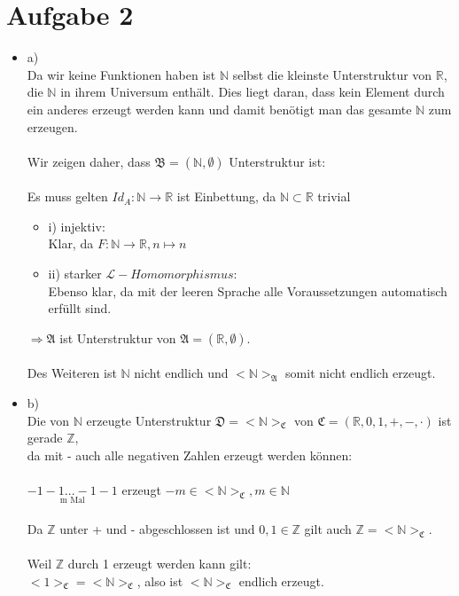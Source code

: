 \documentclass[a4paper]{scrartcl}
\begin{document}
\section*{Aufgabe 2}%
\label{sec:aufgabe_2}
\begin{itemize}
    \item a)\\
        Da wir keine Funktionen haben ist $\mathds{N}$ selbst die kleinste Unterstruktur von $\mathds{R}$, die $\mathds{N}$ in ihrem Universum enthält.
        Dies liegt daran, dass kein Element durch ein anderes erzeugt werden kann und damit benötigt man das gesamte $\mathds{N}$ zum erzeugen.\\
        \\Wir zeigen daher, dass $\mathfrak{B} = (\mathds{N}, \emptyset)$ Unterstruktur ist:\\
        \\Es muss gelten $Id_A: \mathds{N} \rightarrow \mathds{R}$ ist Einbettung, da $\mathds{N} \subset \mathds{R}$ trivial
        \begin{itemize}
            \item i) injektiv:\\
                Klar, da $F: \mathds{N} \rightarrow \mathds{R}, n \mapsto n$
            \item ii) starker $\mathscr{L}-Homomorphismus$:\\
                Ebenso klar, da mit der leeren Sprache alle Voraussetzungen automatisch erfüllt sind.
        \end{itemize}
        $\Rightarrow \mathfrak{A}$ ist Unterstruktur von $\mathfrak{A} = (\mathds{R}, \emptyset)$.\\

        \\Des Weiteren ist $\mathds{N}$ nicht endlich und $<\mathds{N}>_\mathfrak{A}$ somit nicht endlich erzeugt.\\

    \item b)\\
        Die von $\mathds{N}$ erzeugte Unterstruktur $\mathfrak{D} = <\mathds{N}>_\mathfrak{C}$ von $\mathfrak{C} = (\mathds{R},0,1,+,-,\cdot)$ ist gerade $\mathds{Z}$,\\
        da mit - auch alle negativen Zahlen erzeugt werden können:\\
        \\$\underset{\text{m Mal}}{-1-1...-1-1}$ erzeugt $-m \in <\mathds{N}>_\mathfrak{C}, m \in \mathds{N}$\\
        \\Da $\mathds{Z}$ unter + und - abgeschlossen ist und $0,1 \in \mathds{Z}$ gilt auch $\mathds{Z} = <\mathds{N}>_\mathfrak{C}$.\\
        \\Weil $\mathds{Z}$ durch 1 erzeugt werden kann gilt:\\
        $<1>_\mathfrak{C} = <\mathds{N}>_\mathfrak{C}$, also ist $<\mathds{N}>_\mathfrak{C}$ endlich erzeugt.

\end{itemize}
\end{document}
